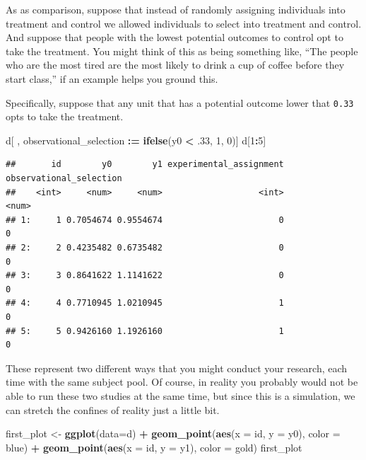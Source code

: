 \documentclass[
]{article}
\newenvironment{Shaded}{\begin{snugshade}}{\end{snugshade}}
\newcommand{\AttributeTok}[1]{\textcolor[rgb]{0.13,0.29,0.53}{#1}}
\newcommand{\DecValTok}[1]{\textcolor[rgb]{0.00,0.00,0.81}{#1}}
\newcommand{\FunctionTok}[1]{\textcolor[rgb]{0.13,0.29,0.53}{\textbf{#1}}}
\newcommand{\NormalTok}[1]{#1}
\newcommand{\OtherTok}[1]{\textcolor[rgb]{0.56,0.35,0.01}{#1}}
\newcommand{\SpecialCharTok}[1]{\textcolor[rgb]{0.81,0.36,0.00}{\textbf{#1}}}
\theoremstyle{definition}
\theoremstyle{definition}
\theoremstyle{definition}
\theoremstyle{definition}
\theoremstyle{remark}
\begin{document}
As as comparison, suppose that instead of randomly assigning individuals into treatment and control we allowed individuals to select into treatment and control. And suppose that people with the lowest potential outcomes to control opt to take the treatment. You might think of this as being something like, ``The people who are the most tired are the most likely to drink a cup of coffee before they start class,'' if an example helps you ground this.

Specifically, suppose that any unit that has a potential outcome lower that \texttt{0.33} opts to take the treatment.

\begin{Shaded}
\begin{Highlighting}[]
\NormalTok{d[ , observational\_selection }\SpecialCharTok{:=} \FunctionTok{ifelse}\NormalTok{(y0 }\SpecialCharTok{\textless{}}\NormalTok{ .}\DecValTok{33}\NormalTok{, }\DecValTok{1}\NormalTok{, }\DecValTok{0}\NormalTok{)]}
\NormalTok{d[}\DecValTok{1}\SpecialCharTok{:}\DecValTok{5}\NormalTok{]}
\end{Highlighting}
\end{Shaded}

\begin{verbatim}
##       id        y0        y1 experimental_assignment observational_selection
##    <int>     <num>     <num>                   <int>                   <num>
## 1:     1 0.7054674 0.9554674                       0                       0
## 2:     2 0.4235482 0.6735482                       0                       0
## 3:     3 0.8641622 1.1141622                       0                       0
## 4:     4 0.7710945 1.0210945                       1                       0
## 5:     5 0.9426160 1.1926160                       1                       0
\end{verbatim}

These represent two different ways that you might conduct your research, each time with the same subject pool. Of course, in reality you probably would not be able to run these two studies at the same time, but since this is a simulation, we can stretch the confines of reality just a little bit.

\begin{Shaded}
\begin{Highlighting}[]
\NormalTok{first\_plot }\OtherTok{\textless{}{-}} \FunctionTok{ggplot}\NormalTok{(}\AttributeTok{data=}\NormalTok{d) }\SpecialCharTok{+} 
  \FunctionTok{geom\_point}\NormalTok{(}\FunctionTok{aes}\NormalTok{(}\AttributeTok{x =}\NormalTok{ id, }\AttributeTok{y =}\NormalTok{ y0), }\AttributeTok{color =}\NormalTok{ blue) }\SpecialCharTok{+} 
  \FunctionTok{geom\_point}\NormalTok{(}\FunctionTok{aes}\NormalTok{(}\AttributeTok{x =}\NormalTok{ id, }\AttributeTok{y =}\NormalTok{ y1), }\AttributeTok{color =}\NormalTok{ gold)}
\NormalTok{first\_plot  }
\end{Highlighting}
\end{Shaded}
\end{document}
